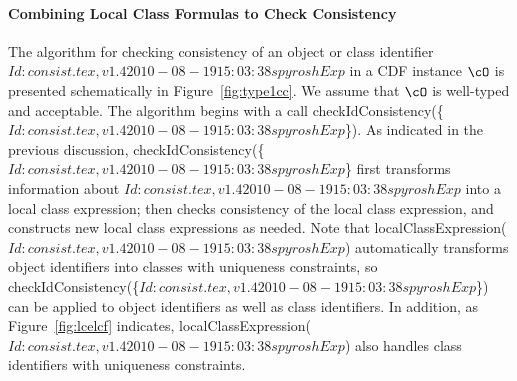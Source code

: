 \paragraph*{Combining Local Class Formulas to Check Consistency}
The algorithm for checking consistency of an object or class
identifier $Id: consist.tex,v 1.4 2010-08-19 15:03:38 spyrosh Exp $ in a CDF instance $\cO$ is presented schematically in
Figure~\ref{fig:type1cc}.  We assume that $\cO$ is well-typed and
acceptable.  The algorithm begins with a call {\sf
checkIdConsistency(\{$Id: consist.tex,v 1.4 2010-08-19 15:03:38 spyrosh Exp $\})}.  As indicated in the previous
discussion, {\sf checkIdConsistency(\{$Id: consist.tex,v 1.4 2010-08-19 15:03:38 spyrosh Exp $\}} first transforms
information about $Id: consist.tex,v 1.4 2010-08-19 15:03:38 spyrosh Exp $ into a local class expression; then checks
consistency of the local class expression, and constructs new local
class expressions as needed.  Note that {\sf
localClassExpression($Id: consist.tex,v 1.4 2010-08-19 15:03:38 spyrosh Exp $)} automatically transforms object
identifiers into classes with uniqueness constraints, so {\sf
checkIdConsistency(\{$Id: consist.tex,v 1.4 2010-08-19 15:03:38 spyrosh Exp $\})} can be applied to object identifiers as
well as class identifiers.  In addition, as Figure~\ref{fig:lcelcf}
indicates, {\sf localClassExpression($Id: consist.tex,v 1.4 2010-08-19 15:03:38 spyrosh Exp $)} also handles class
identifiers with uniqueness constraints.


